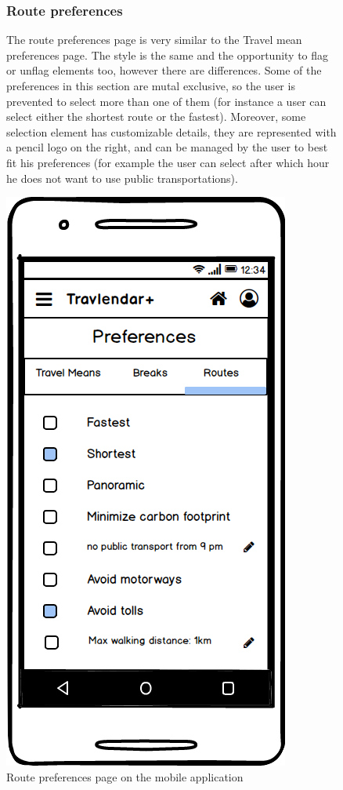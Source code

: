 		\begin{figure}
				\begin{flushleft}
				\subsubsection{Route preferences}
				The route preferences page is very similar to the Travel mean preferences page. The style is the same and the opportunity to flag or unflag elements too, however there are differences. Some of the preferences in this section are mutal exclusive, so the user is prevented to select more than one of them (for instance a user can select either the shortest route or the fastest). Moreover, some selection element has customizable details, they are represented with a pencil logo on the right, and can be managed by the user to best fit his preferences (for example the user can select after which hour he does not want to use public transportations).
			\end{flushleft}
		\centering
		\includegraphics[width=0.5\linewidth]{mockups/PreferencesRoutes}
		\caption{Route preferences page on the mobile application}
		\label{fig:preferencesroutes}
		
	\end{figure}
	
